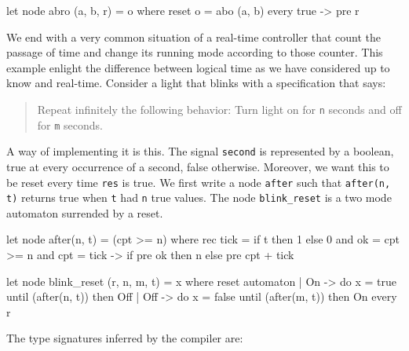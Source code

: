 \documentclass[11pt,titlepage,twoside]{report}
\begin{document}
\begin{runverbatim}[withresult,include=abo]
  let node abro (a, b, r) = o where
    reset
      o = abo (a, b)
    every true -> pre r
\end{runverbatim}



We end with a very common situation of a real-time controller that count
the passage of time and change its running mode according to those counter. This
example enlight the difference between logical time as we have considered up to know
and real-time. Consider a light that
blinks with a specification that says:

\begin{quote}
  Repeat infinitely the following behavior:
  Turn light on for \texttt{n} seconds and off for
  \texttt{m} seconds.
\end{quote}

A way of implementing it is this. The signal \texttt{second} is
represented by a boolean, true at every occurrence of a second, false
otherwise. Moreover, we want this to be reset every time \texttt{res}
is true. We first write a node \texttt{after} such that
\texttt{after(n, t)} returns true when \texttt{t} had \texttt{n} true
values. The node \texttt{blink\_reset} is a two mode automaton
surrended by a reset.

\begin{runverbatim}[withresult,label=after,label=blink_reset]
let node after(n, t) = (cpt >= n) where
  rec tick = if t then 1 else 0
  and ok = cpt >= n
  and cpt = tick -> if pre ok then n else pre cpt + tick

let node blink_reset (r, n, m, t) = x where
 reset
   automaton
   | On  -> do x = true  until (after(n, t)) then Off
   | Off -> do x = false until (after(m, t)) then On
 every r
\end{runverbatim}

\medskip
The type signatures inferred by the compiler are:
\runverbatimmsg{}
\end{document}
